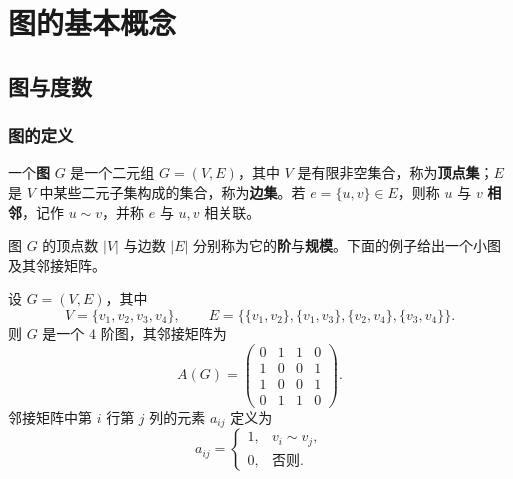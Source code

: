	\setcounter{page}{1}
	\tableofcontents
	\newpage



	\chapter{图的基本概念}
	\section{图与度数}
	\subsection{图的定义}
	一个\textbf{图} $G$ 是一个二元组 $G=(V,E)$，其中 $V$ 是有限非空集合，称为\textbf{顶点集}；$E$ 是 $V$ 中某些二元子集构成的集合，称为\textbf{边集}。若 $e=\{u,v\}\in E$，则称 $u$ 与 $v$ \textbf{相邻}，记作 $u\sim v$，并称 $e$ 与 $u,v$ 相关联\cite{graphbook}。

	图 $G$ 的顶点数 $|V|$ 与边数 $|E|$ 分别称为它的\textbf{阶}与\textbf{规模}。下面的例子给出一个小图及其邻接矩阵。

	\begin{example}\label{ex:graph1}
		设 $G=(V,E)$，其中
		\[
			V=\{v_1,v_2,v_3,v_4\},\qquad
			E=\{\{v_1,v_2\},\{v_1,v_3\},\{v_2,v_4\},\{v_3,v_4\}\}.
		\]
		则 $G$ 是一个 $4$ 阶图，其邻接矩阵为
		\[
			A(G)=
			\begin{pmatrix}
				0 & 1 & 1 & 0 \\
				1 & 0 & 0 & 1 \\
				1 & 0 & 0 & 1 \\
				0 & 1 & 1 & 0
			\end{pmatrix}.
		\]
		邻接矩阵中第 $i$ 行第 $j$ 列的元素 $a_{ij}$ 定义为
		\[
			a_{ij}=
			\begin{cases}
				1, & v_i\sim v_j,\\
				0, & \text{否则}.
			\end{cases}
		\]
	\end{example}

